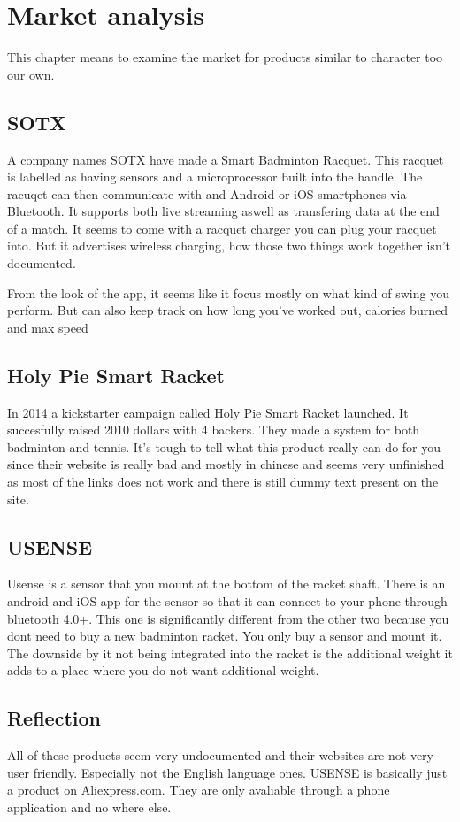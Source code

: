 \chapter{Market analysis}
This chapter means to examine the market for products similar to character too our own.

\section{SOTX}
A company names SOTX have made a Smart Badminton Racquet. This racquet is labelled as having sensors and a microprocessor built into the handle.  The racuqet can then communicate with and Android or iOS smartphones via Bluetooth. It supports both live streaming aswell as transfering data at the end of a match. It seems to come with a racquet charger you can plug your racquet into. But it advertises wireless charging, how those two things work together isn't documented. 

From the look of the app, it seems like it focus mostly on what kind of swing you perform. But can also keep track on how long you've worked out, calories burned and max speed

\section{Holy Pie Smart Racket}
In 2014 a kickstarter campaign called Holy Pie Smart Racket launched. It succesfully raised 2010 dollars with 4 backers. They made a system for both badminton and tennis. It's tough to tell what this product really can do for you since their website is really bad and mostly in chinese and seems very unfinished as most of the links does not work and there is still dummy text present on the site.

\section{USENSE}
Usense is a sensor that you mount at the bottom of the racket shaft. There is an android and iOS app for the sensor so that it can connect to your phone through bluetooth 4.0+. This one is significantly different from the other two because you dont need to buy a new badminton racket. You only buy a sensor and mount it. The downside by it not being integrated into the racket is the additional weight it adds to a place where you do not want additional weight.

\section{Reflection}
All of these products seem very undocumented and their websites are not very user friendly. Especially not the English language ones. USENSE is basically just a product on Aliexpress.com. They are only avaliable through a phone application and no where else. 